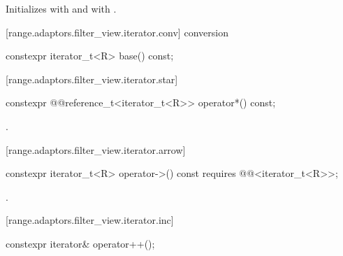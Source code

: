 \begin{itemdescr}
\pnum
\effects Initializes  with  and 
with .
\end{itemdescr}

[range.adaptors.filter_view.iterator.conv]{ conversion}

%
\begin{itemdecl}
constexpr iterator_t<R> base() const;
\end{itemdecl}

\begin{itemdescr}
\pnum
\oldtxt{\returns}  
\end{itemdescr}

[range.adaptors.filter_view.iterator.star]{}

%
\begin{itemdecl}
constexpr @@reference_t<iterator_t<R>> operator*() const;
\end{itemdecl}

\begin{itemdescr}
\pnum
\returns {}.
\end{itemdescr}

{\color{newclr}
[range.adaptors.filter_view.iterator.arrow]{}

%
\begin{itemdecl}
constexpr iterator_t<R> operator->() const
  requires @@<iterator_t<R>>;
\end{itemdecl}

\begin{itemdescr}
\pnum
\returns {}.
\end{itemdescr}
} %

[range.adaptors.filter_view.iterator.inc]{}

%
\begin{itemdecl}
constexpr iterator& operator++();
\end{itemdecl}

